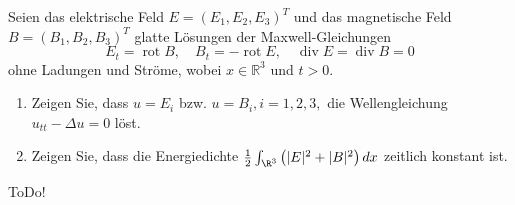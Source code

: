 
\begin{exercise}

Seien das elektrische Feld $E=\left(E_{1}, E_{2}, E_{3}\right)^{T}$ und das magnetische Feld $B=\left(B_{1}, B_{2}, B_{3}\right)^{T}$ glatte Lösungen der Maxwell-Gleichungen
$$
E_{t}=\operatorname{rot} B, \quad B_{t}=-\operatorname{rot} E, \quad \operatorname{div} E=\operatorname{div} B=0
$$
ohne Ladungen und Ströme, wobei $x \in \mathbb{R}^{3}$ und $t>0$.

\begin{enumerate}[label = (\roman*)]
\item Zeigen Sie, dass $u=E_{i}$ bzw. $u=B_{i}, i=1,2,3,$ die Wellengleichung $u_{t t}-\Delta u=0$ löst.
\item Zeigen Sie, dass die Energiedichte $\frac{1}{2} \int_{\R^3}\left(|E|^{2}+|B|^{2}\right) d x$ zeitlich konstant ist.
\end{enumerate}

\end{exercise}


\begin{solution}

ToDo!

\end{solution}

